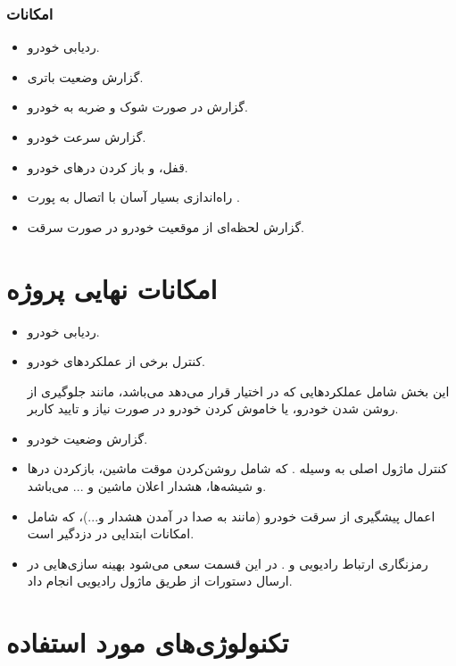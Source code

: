 \documentclass[a4paper,12pt]{report}
\begin{document}
	\subsubsection{
		امکانات
	}\label{subsubsec3:subsec3:sec3:chap1}
	\begin{itemize}[nosep]\label{item1:subsec3:sec2:chap1}
		\item
			ردیابی خودرو.
		\item
			گزارش وضعیت باتری.
		\item
			گزارش در صورت شوک و ضربه به خودرو.
		\item
			گزارش سرعت خودرو.
		\item
			قفل، و باز کردن در‌های خودرو.
		\item
			راه‌اندازی بسیار آسان با اتصال به پورت
			.
		\item
			گزارش لحظه‌ای از موقعیت خودرو در صورت سرقت.

	\end{itemize}

	\section{
	امکانات نهایی پروژه
	}\label{sec4:chap1}
	\begin{itemize}[nosep]\label{item1:sec4:chap1}
		\item
			ردیابی خودرو.
		\item
			کنترل برخی از عملکرد‌های خودرو.

			این بخش شامل عملکرد‌هایی که
			در اختیار قرار می‌دهد می‌باشد،‌ مانند جلوگیری از روشن شدن خودرو، یا خاموش کردن خودرو در صورت نیاز و تایید کاربر.
		\item
			گزارش وضعیت خودرو.
		\item
			کنترل ماژول اصلی به وسیله
			.
			که شامل روشن‌کردن موقت ماشین، بازکردن درها و شیشه‌ها، هشدار اعلان ماشین و ... می‌باشد.
		\item
			اعمال پیشگیری از سرقت خودرو (مانند به صدا در آمدن هشدار و...)، که شامل امکانات ابتدایی در دزدگیر است.
		\item
			رمزنگاری ارتباط رادیویی و
			.
			در این قسمت سعی می‌شود بهینه سازی‌هایی در ارسال دستورات
			 از طریق ماژول رادیویی انجام داد.
	\end{itemize}
	\section{
		تکنولوژی‌های مورد استفاده
	}\label{sec5:chap1}
\end{document}
